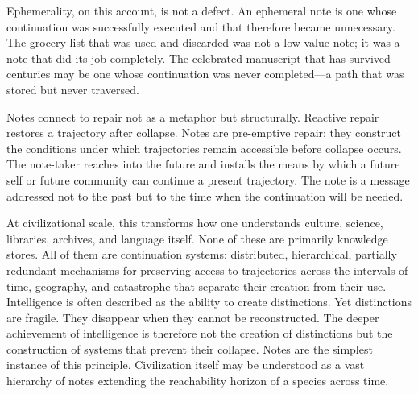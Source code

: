 \documentclass[12pt, a4paper]{article}
\begin{document}
Ephemerality, on this account, is not a defect. An ephemeral note is one whose
continuation was successfully executed and that therefore became unnecessary. The
grocery list that was used and discarded was not a low-value note; it was a
note that did its job completely. The celebrated manuscript that has survived
centuries may be one whose continuation was never completed---a path that was
stored but never traversed.

Notes connect to repair not as a metaphor but structurally. Reactive repair
restores a trajectory after collapse. Notes are pre-emptive repair: they construct
the conditions under which trajectories remain accessible before collapse occurs.
The note-taker reaches into the future and installs the means by which a future
self or future community can continue a present trajectory. The note is a
message addressed not to the past but to the time when the continuation will be
needed.

At civilizational scale, this transforms how one understands culture, science,
libraries, archives, and language itself. None of these are primarily knowledge
stores. All of them are continuation systems: distributed, hierarchical, partially
redundant mechanisms for preserving access to trajectories across the intervals of
time, geography, and catastrophe that separate their creation from their use.
Intelligence is often described as the ability to create distinctions. Yet
distinctions are fragile. They disappear when they cannot be reconstructed. The
deeper achievement of intelligence is therefore not the creation of distinctions
but the construction of systems that prevent their collapse. Notes are the simplest
instance of this principle. Civilization itself may be understood as a vast
hierarchy of notes extending the reachability horizon of a species across time.

\newpage
\end{document}
